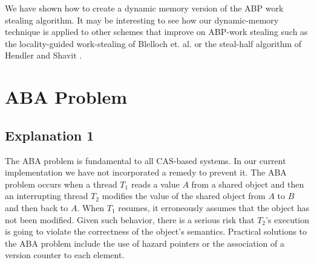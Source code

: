 We have shown how to create a dynamic memory version of the ABP work
stealing algorithm. It may be interesting to see how our
dynamic-memory technique is applied to other schemes that improve on
ABP-work stealing such as the locality-guided work-stealing of
Blelloch et. al. \cite{Acar2002} or the steal-half algorithm of
Hendler and Shavit \cite{Hendler2002}.











\section{ABA Problem}

\subsection{Explanation 1}

The ABA problem is fundamental to all CAS-based systems. In our
current implementation we have not incorporated a remedy to prevent
it. The ABA problem occurs when a thread $T_1$ reads a value $A$ from
a shared object and then an interrupting thread $T_2$ modifies the
value of the shared object from $A$ to $B$ and then back to $A$. When
$T_1$ resumes, it erroneously assumes that the object has not been
modified. Given such behavior, there is a serious risk that $T_2$'s
execution is going to violate the correctness of the object's
semantics. Practical solutions to the ABA problem include the use of
hazard pointers \cite{Michael2004} or the association of a version
counter to each element.

